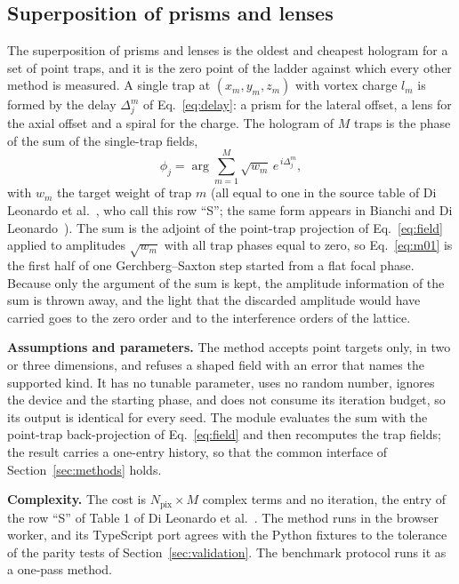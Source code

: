 
\subsection{Superposition of prisms and lenses}\label{sec:m01}

The superposition of prisms and lenses is the oldest and cheapest hologram for a set of point traps, and it is the zero point of the ladder against which every other method is measured. A single trap at $(x_m,y_m,z_m)$ with vortex charge $l_m$ is formed by the delay $\Delta_j^m$ of Eq.~\eqref{eq:delay}: a prism for the lateral offset, a lens for the axial offset and a spiral for the charge. The hologram of $M$ traps is the phase of the sum of the single-trap fields,
\begin{equation}
\phi_j=\arg\sum_{m=1}^{M}\sqrt{w_m}\,e^{\,i\Delta_j^m},
\label{eq:m01}
\end{equation}
with $w_m$ the target weight of trap $m$ (all equal to one in the source table of Di Leonardo et al.~\cite{dileonardo}, who call this row ``S''; the same form appears in Bianchi and Di Leonardo~\cite{bianchi2010}). The sum is the adjoint of the point-trap projection of Eq.~\eqref{eq:field} applied to amplitudes $\sqrt{w_m}$ with all trap phases equal to zero, so Eq.~\eqref{eq:m01} is the first half of one Gerchberg--Saxton step started from a flat focal phase. Because only the argument of the sum is kept, the amplitude information of the sum is thrown away, and the light that the discarded amplitude would have carried goes to the zero order and to the interference orders of the lattice.

\textbf{Assumptions and parameters.} The method accepts point targets only, in two or three dimensions, and refuses a shaped field with an error that names the supported kind. It has no tunable parameter, uses no random number, ignores the device and the starting phase, and does not consume its iteration budget, so its output is identical for every seed. The module evaluates the sum with the point-trap back-projection of Eq.~\eqref{eq:field} and then recomputes the trap fields; the result carries a one-entry history, so that the common interface of Section~\ref{sec:methods} holds.

\textbf{Complexity.} The cost is $N_{\mathrm{pix}}\times M$ complex terms and no iteration, the entry of the row ``S'' of Table 1 of Di Leonardo et al.~\cite{dileonardo}. The method runs in the browser worker, and its TypeScript port agrees with the Python fixtures to the tolerance of the parity tests of Section~\ref{sec:validation}. The benchmark protocol runs it as a one-pass method.


